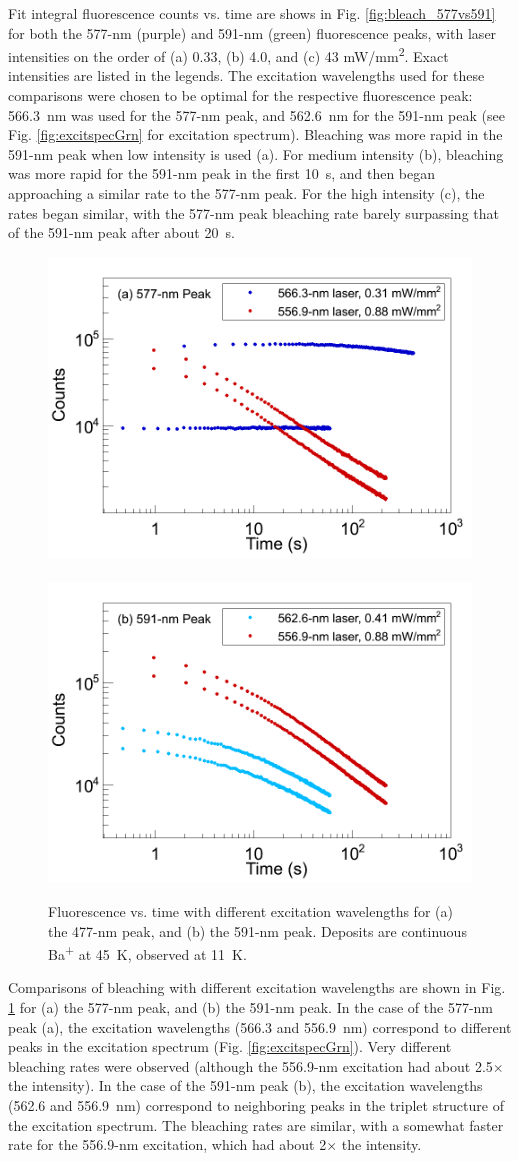 Fit integral fluorescence counts vs. time are shows in Fig. \ref{fig:bleach_577vs591} for both the 577-nm (purple) and 591-nm (green) fluorescence peaks, with laser intensities on the order of (a) 0.33, (b) 4.0, and (c) 43 mW/mm\textsuperscript{2}.  Exact intensities are listed in the legends.  The excitation wavelengths used for these comparisons were chosen to be optimal for the respective fluorescence peak:  566.3~nm was used for the 577-nm peak, and 562.6~nm for the 591-nm peak (see Fig. \ref{fig:excitspecGrn} for excitation spectrum).  Bleaching was more rapid in the 591-nm peak when low intensity is used (a).  For medium intensity (b), bleaching was more rapid for the 591-nm peak in the first 10~s, and then began approaching a similar rate to the 577-nm peak.  For the high intensity (c), the rates began similar, with the 577-nm peak bleaching rate barely surpassing that of the 591-nm peak after about 20~s.

\begin{figure} %
        \centering
                \includegraphics[width=.5\textwidth]{figures/bleach_577-nm_555vs564.png}
                ~
                \includegraphics[width=.5\textwidth]{figures/bleach_591-nm_555vs560.png}
                \caption{Fluorescence vs. time with different excitation wavelengths for (a) the 477-nm peak, and (b) the 591-nm peak.  Deposits are continuous Ba\textsuperscript{+} at 45~K, observed at 11~K.}
\label{fig:bleach_excitCompare}
\end{figure}

Comparisons of bleaching with different excitation wavelengths are shown in Fig. \ref{fig:bleach_excitCompare} for (a) the 577-nm peak, and (b) the 591-nm peak.  In the case of the 577-nm peak (a), the excitation wavelengths (566.3 and 556.9~nm) correspond to different peaks in the excitation spectrum (Fig. \ref{fig:excitspecGrn}).  Very different bleaching rates were observed (although the 556.9-nm excitation had about 2.5$\times$ the intensity).  In the case of the 591-nm peak (b), the excitation wavelengths (562.6 and 556.9~nm) correspond to neighboring peaks in the triplet structure of the excitation spectrum.  The bleaching rates are similar, with a somewhat faster rate for the 556.9-nm excitation, which had about 2$\times$ the intensity.

